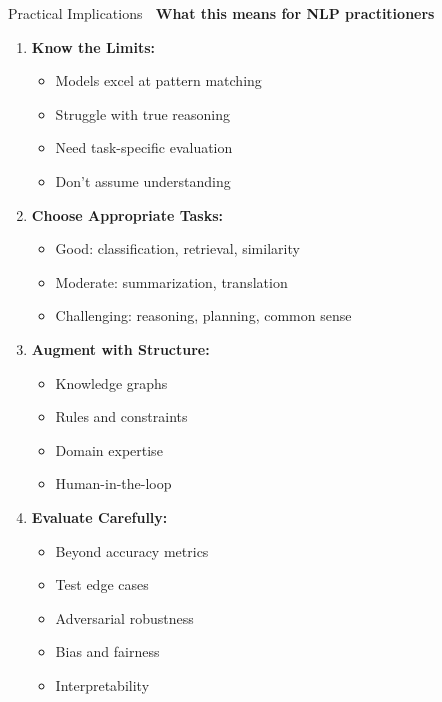 \documentclass[aspectratio=169]{beamer}
\begin{document}
\begin{frame}[shrink=10]{Practical Implications 💼}
\textbf{What this means for NLP practitioners}

\vspace{1em}

\begin{enumerate}\setlength{\itemsep}{0pt}
    \item \textbf{Know the Limits:}
    \begin{itemize}\setlength{\itemsep}{0pt}
        \item Models excel at pattern matching
        \item Struggle with true reasoning
        \item Need task-specific evaluation
        \item Don't assume understanding
    \end{itemize}

    \item \textbf{Choose Appropriate Tasks:}
    \begin{itemize}\setlength{\itemsep}{0pt}
        \item Good: classification, retrieval, similarity
        \item Moderate: summarization, translation
        \item Challenging: reasoning, planning, common sense
    \end{itemize}

    \item \textbf{Augment with Structure:}
    \begin{itemize}\setlength{\itemsep}{0pt}
        \item Knowledge graphs
        \item Rules and constraints
        \item Domain expertise
        \item Human-in-the-loop
    \end{itemize}

    \item \textbf{Evaluate Carefully:}
    \begin{itemize}\setlength{\itemsep}{0pt}
        \item Beyond accuracy metrics
        \item Test edge cases
        \item Adversarial robustness
        \item Bias and fairness
        \item Interpretability
    \end{itemize}


\end{enumerate}
\end{frame}
\end{document}
